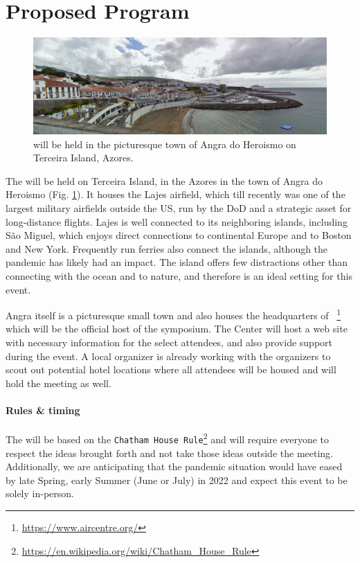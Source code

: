 \section{Proposed Program}
\label{sec:pgm}

\begin{figure}[!h]
  \centering
  \includegraphics[scale=0.5]{fig/angra.png}
  \caption{\symp will be held in the picturesque town of Angra do
    Heroismo on Terceira Island, Azores.}
  \label{fig:angra}
\end{figure}

The \symp will be held on Terceira Island, in the Azores in the town of
Angra do Heroismo (Fig. \ref{fig:angra}). It houses the Lajes airfield,
which till recently was one of the largest military airfields outside
the US, run by the DoD and a strategic asset for long-distance
flights. Lajes is well connected to its neighboring islands, including
S\~{a}o Miguel, which enjoys direct connections to continental Europe
and to Boston and New York. Frequently run ferries also connect the
islands, although the pandemic has likely had an impact. The island
offers few distractions other than connecting with the ocean and to
nature, and therefore is an ideal setting for this event.

Angra itself is a picturesque small town and also houses the
headquarters of \aire~\footnote{\url{https://www.aircentre.org/}} which
will be the official host of the symposium. The Center will host a web
site with necessary information for the select attendees, and also
provide support during the event. A local organizer is already working
with the organizers to scout out potential hotel locations where all
attendees will be housed and will hold the meeting as well. 

\paragraph{Rules \& timing} The \symp will be based on the
\texttt{Chatham House
  Rule}\footnote{\url{https://en.wikipedia.org/wiki/Chatham_House_Rule}}
and will require everyone to respect the ideas brought forth and not
take those ideas outside the meeting. Additionally, we are anticipating
that the pandemic situation would have eased by late Spring, early
Summer (June or July) in 2022 and expect this event to be solely
in-person.

